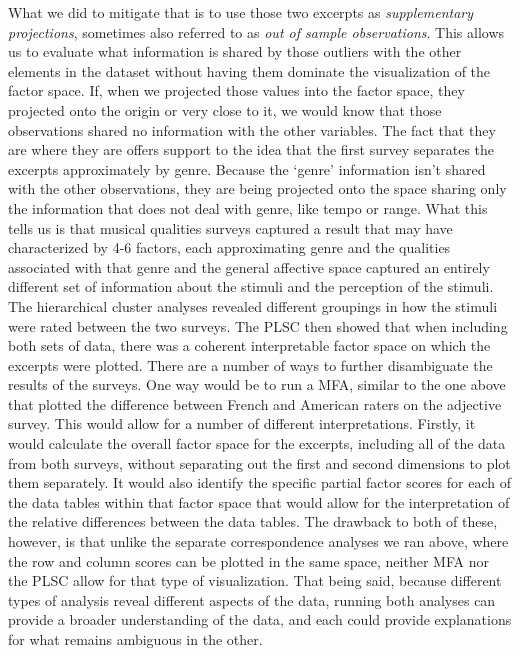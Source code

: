 \documentclass[
  english,
  man,floatsintext]{apa6}
\begin{document}
What we did to mitigate that is to use those two excerpts as \emph{supplementary projections}, sometimes also referred to as \emph{out of sample observations}. This allows us to evaluate what information is shared by those outliers with the other elements in the dataset without having them dominate the visualization of the factor space. If, when we projected those values into the factor space, they projected onto the origin or very close to it, we would know that those observations shared no information with the other variables. The fact that they are where they are offers support to the idea that the first survey separates the excerpts approximately by genre. Because the `genre' information isn't shared with the other observations, they are being projected onto the space sharing only the information that does not deal with genre, like tempo or range. What this tells us is that musical qualities surveys captured a result that may have characterized by 4-6 factors, each approximating genre and the qualities associated with that genre and the general affective space captured an entirely different set of information about the stimuli and the perception of the stimuli.\\
The hierarchical cluster analyses revealed different groupings in how the stimuli were rated between the two surveys. The PLSC then showed that when including both sets of data, there was a coherent interpretable factor space on which the excerpts were plotted. There are a number of ways to further disambiguate the results of the surveys. One way would be to run a MFA, similar to the one above that plotted the difference between French and American raters on the adjective survey. This would allow for a number of different interpretations. Firstly, it would calculate the overall factor space for the excerpts, including all of the data from both surveys, without separating out the first and second dimensions to plot them separately. It would also identify the specific partial factor scores for each of the data tables within that factor space that would allow for the interpretation of the relative differences between the data tables. The drawback to both of these, however, is that unlike the separate correspondence analyses we ran above, where the row and column scores can be plotted in the same space, neither MFA nor the PLSC allow for that type of visualization. That being said, because different types of analysis reveal different aspects of the data, running both analyses can provide a broader understanding of the data, and each could provide explanations for what remains ambiguous in the other.
\end{document}
